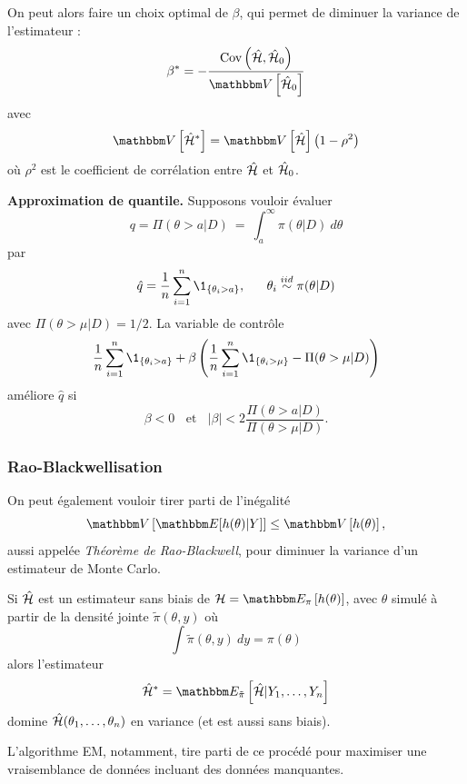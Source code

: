 On peut alors faire un choix optimal de $\beta$, qui permet de diminuer la variance de l'estimateur :
$$
 \beta^* = - \frac{\mbox{Cov} \left(\hat{\cal{H}} ,\hat{\cal{H}}_0 \right)}{\V\left[\hat{\cal{H}}_0 \right]} 
$$
avec  
$$
\V\left[\hat{\cal{H}}^* \right] =  \V\left[\hat{\cal{H}} \right] \left(1-\rho^2\right)
$$
où $\rho^2$ est le coefficient de corrélation entre $\hat{\cal{H}}$ et $\hat{\cal{H}}_0$. \\

\begin{exo}{\bf Approximation de quantile.}
Supposons vouloir évaluer 
$$
q = \Pi(\theta>a|D) \ = \ \int_a^{\infty} \pi(\theta|D) \ d\theta
$$
par
$$
\hat{q} = \frac{1}{n} \sum\limits_{i=1}^n \1_{\{\theta_i > a\}}, \ \ \ \ \ \theta_i \overset{iid}{\sim} \pi(\theta|D)
$$
avec
$
\Pi(\theta>\mu|D) = 1/2
$. La variable de contrôle
$$
\frac{1}{n} \sum\limits_{i=1}^n \1_{\{\theta_i > a\}} + \beta\left(\frac{1}{n} \sum\limits_{i=1}^n \1_{\{\theta_i > \mu\}} - \Pi(\theta>\mu|D)\right)
$$
améliore $\hat{q}$ si
$$
\beta < 0 \ \ \ \ \text{et} \ \ \ \ |\beta|<2\frac{\Pi(\theta>a|D)}{\Pi(\theta>\mu|D)}.
$$


\end{exo}


\subsubsection{Rao-Blackwellisation}

On peut également vouloir tirer parti de l'inégalité 
$$
\V\left[\E[h(\theta)|Y]\right] \leq \V\left[h(\theta)\right],
$$
aussi appelée \emph{Théorème de Rao-Blackwell}, pour diminuer la variance d'un estimateur de Monte Carlo. 

\begin{proposition}
Si $\hat{\cal{H}}$ est un estimateur sans biais de ${\cal{H}}=\E_{\pi}\left[h(\theta)\right]$, avec $\theta$ simulé à partir de la densité jointe $\tilde{\pi}(\theta,y)$ où
$$
\int \tilde{\pi}(\theta,y) \ dy = \pi(\theta)
$$
alors l'estimateur
$$
\hat{\cal{H}}^* = \E_{\tilde{\pi}}\left[\hat{\cal{H}}|Y_1,\ldots,Y_n \right] 
$$
domine $\hat{\cal{H}}(\theta_1,\ldots,\theta_n)$ en variance (et est aussi sans biais).
\end{proposition}

L'algorithme EM, notamment, tire parti de ce procédé pour maximiser une vraisemblance de données incluant des données manquantes. 



